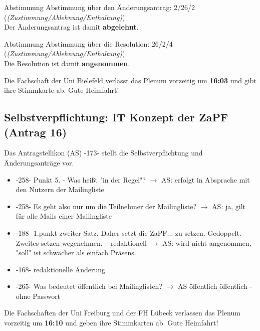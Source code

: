     \begin{danger}{Abstimmung}
      Abstimmung über den Änderungsantrag: 2/26/2 (\textit{(Zustimmung/Ablehnung/Enthaltung)}) \\
      Der Änderungsantrag ist damit \textbf{abgelehnt}.
    \end{danger}

    \begin{success}{Abstimmung}
      Abstimmung über die Resolution: 26/2/4 (\textit{(Zustimmung/Ablehnung/Enthaltung)}) \\
      Die Resolution ist damit \textbf{angenommen}.
    \end{success}

    \begin{info}{}
      Die Fachschaft der Uni Bielefeld verlässt das Plenum vorzeitig um \textbf{16:03} und gibt ihre Stimmkarte ab. Gute Heimfahrt!
    \end{info}

  \subsection{Selbstverpflichtung: IT Konzept der ZaPF (Antrag 16)}
    Das Antragstellikon (AS) -173- stellt die Selbstverpflichtung und Änderungsanträge vor.
    \begin{itemize}
      \item -258- Punkt 5. - Was heißt "in der Regel"?
        $\rightarrow$ AS: erfolgt in Absprache mit den Nutzern der Mailingliste
      \item -258- Es geht also nur um die Teilnehmer der Mailingliste?
        $\rightarrow$ AS: ja, gilt für alle Mails einer Mailingliste
      \item -188- 1.punkt zweiter Satz. Daher setzt die ZaPF... zu setzen. Gedoppelt. Zweites setzen  wegenehmen. -- redaktionell
        $\rightarrow$ AS: wird nicht angenommen, "soll" ist schwächer als einfach Präsens.
      \item -168- redaktionelle Änderung
      \item -265- Was bedeutet öffentlich bei Mailinglisten?
        $\rightarrow$ AS öffentlich öffentlich - ohne Passwort
    \end{itemize}

    \begin{info}{}
      Die Fachschaften der Uni Freiburg und der FH Lübeck verlassen das Plenum vorzeitig um \textbf{16:10} und geben ihre Stimmkarten ab. Gute Heimfahrt!
    \end{info}

